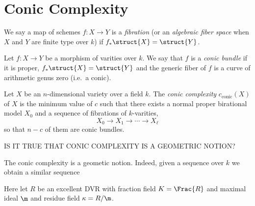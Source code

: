 \documentclass[12pt]{article}
\theoremstyle{plain}
\begin{document}
\section{Conic Complexity}

\renewcommand{\X}{\mathcal{X}}

\begin{defn}
We say a map of schemes $f : X \to Y$ is a \textit{fibration} (or an \textit{algebraic fiber space} when $X$ and $Y$ are finite type over $k$) if $f_* \struct{X} = \struct{Y}$.
\end{defn}

\begin{defn}
Let $f : X \to Y$ be a morphism of varities over $k$. We say that $f$ is a \textit{conic bundle} if it is proper, $f_* \struct{X} = \struct{Y}$ and the generic fiber of $f$ is a curve of arithmetic genus zero (i.e.\ a conic). 
\end{defn}


\begin{defn}
Let $X$ be an $n$-dimensional variety over a field $k$. The \textit{conic complexity} $c_{\text{conic}}(X)$ of $X$ is the minimum value of $c$ such that there exists a normal proper birational model $X_0$ and a sequence of fibrations of $k$-varities,
\[ X_0 \to X_1 \to \cdots \to X_{\ell} \]
so that $n-c$ of them are conic bundles.
\end{defn}

{\color{red} IS IT TRUE THAT CONIC COMPLEXITY IS A GEOMETRIC NOTION?} 
\begin{rmk}
The conic complexity is a geometic notion. Indeed, given a sequence over $k$ we obtain a similar sequence  
\end{rmk}

Here let $R$ be an excellent DVR with fraction field $K = \Frac{R}$ and maximal ideal $\m$ and residue field $\kappa = R / \m$.
\end{document}
